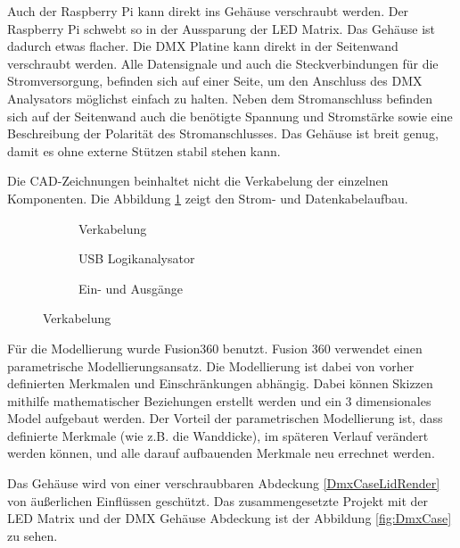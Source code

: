 Auch der Raspberry Pi kann direkt ins Gehäuse verschraubt werden. Der Raspberry Pi schwebt so in der Aussparung der LED Matrix. Das Gehäuse ist dadurch etwas flacher. Die DMX Platine kann direkt in der Seitenwand verschraubt werden. Alle Datensignale und auch die Steckverbindungen für die Stromversorgung, befinden sich auf einer Seite, um den Anschluss des DMX Analysators möglichst einfach zu halten. Neben dem Stromanschluss befinden sich auf der Seitenwand auch die benötigte Spannung und Stromstärke sowie eine Beschreibung der Polarität des Stromanschlusses. Das Gehäuse ist breit genug, damit es ohne externe Stützen stabil stehen kann. 

Die CAD-Zeichnungen beinhaltet nicht die Verkabelung der einzelnen Komponenten. Die Abbildung \ref{fig:DmxCaseWiring} zeigt den Strom- und Datenkabelaufbau.

\begin{figure}[H]
	\centering
	\begin{subfigure}{.32\textwidth}
		\centering
		\caption{Verkabelung}
	\end{subfigure}
	\hfill
	\begin{subfigure}{.32\textwidth}
		\centering
		\caption{USB Logikanalysator}
	\end{subfigure}
	\hfill
	\begin{subfigure}{.32\textwidth}
		\centering
		\caption{Ein- und Ausgänge}
	\end{subfigure}
	\caption{Verkabelung}
	\label{fig:DmxCaseWiring}
\end{figure}

Für die Modellierung wurde Fusion360 benutzt. Fusion 360 verwendet einen parametrische Modellierungsansatz. Die Modellierung ist dabei von vorher definierten Merkmalen und Einschränkungen abhängig. Dabei können Skizzen mithilfe mathematischer Beziehungen erstellt werden und ein 3 dimensionales Model aufgebaut werden. Der Vorteil der parametrischen Modellierung ist, dass definierte Merkmale (wie z.B. die Wanddicke), im späteren Verlauf verändert werden können, und alle darauf aufbauenden Merkmale neu errechnet werden. 

Das Gehäuse wird von einer verschraubbaren Abdeckung \ref{DmxCaseLidRender} von äußerlichen Einflüssen geschützt. Das zusammengesetzte Projekt mit der LED Matrix und der DMX Gehäuse Abdeckung ist der Abbildung \ref{fig:DmxCase} zu sehen.

